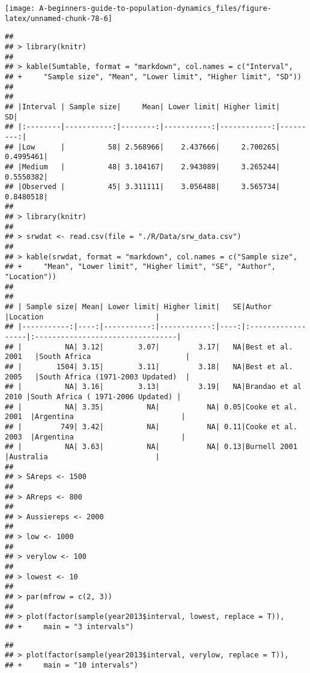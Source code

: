 \documentclass[]{book}
\begin{document}
\begin{center}\texttt{[image: A-beginners-guide-to-population-dynamics\_files/figure-latex/unnamed-chunk-78-6]} \end{center}

\begin{verbatim}
## 
## > library(knitr)
## 
## > kable(Sumtable, format = "markdown", col.names = c("Interval", 
## +     "Sample size", "Mean", "Lower limit", "Higher limit", "SD"))
## 
## 
## |Interval | Sample size|     Mean| Lower limit| Higher limit|        SD|
## |:--------|-----------:|--------:|-----------:|------------:|---------:|
## |Low      |          58| 2.568966|    2.437666|     2.700265| 0.4995461|
## |Medium   |          48| 3.104167|    2.943089|     3.265244| 0.5550382|
## |Observed |          45| 3.311111|    3.056488|     3.565734| 0.8480518|
## 
## > library(knitr)
## 
## > srwdat <- read.csv(file = "./R/Data/srw_data.csv")
## 
## > kable(srwdat, format = "markdown", col.names = c("Sample size", 
## +     "Mean", "Lower limit", "Higher limit", "SE", "Author", "Location"))
## 
## 
## | Sample size| Mean| Lower limit| Higher limit|   SE|Author             |Location                          |
## |-----------:|----:|-----------:|------------:|----:|:------------------|:---------------------------------|
## |          NA| 3.12|        3.07|         3.17|   NA|Best et al. 2001   |South Africa                      |
## |        1504| 3.15|        3.11|         3.18|   NA|Best et al. 2005   |South Africa (1971-2003 Updated)  |
## |          NA| 3.16|        3.13|         3.19|   NA|Brandao et al 2010 |South Africa ( 1971-2006 Updated) |
## |          NA| 3.35|          NA|           NA| 0.05|Cooke et al. 2001  |Argentina                         |
## |         749| 3.42|          NA|           NA| 0.11|Cooke et al. 2003  |Argentina                         |
## |          NA| 3.63|          NA|           NA| 0.13|Burnell 2001       |Australia                         |
## 
## > SAreps <- 1500
## 
## > ARreps <- 800
## 
## > Aussiereps <- 2000
## 
## > low <- 1000
## 
## > verylow <- 100
## 
## > lowest <- 10
## 
## > par(mfrow = c(2, 3))
## 
## > plot(factor(sample(year2013$interval, lowest, replace = T)), 
## +     main = "3 intervals")
\end{verbatim}

\begin{verbatim}
## 
## > plot(factor(sample(year2013$interval, verylow, replace = T)), 
## +     main = "10 intervals")
\end{verbatim}
\end{document}
